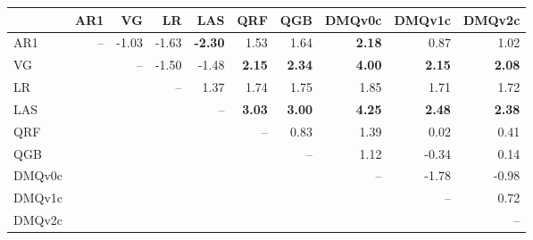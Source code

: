 \begin{tabular}{lrrrrrrrrr}
\toprule
 & AR1 & VG & LR & LAS & QRF & QGB & DMQv0c & DMQv1c & DMQv2c \\
\midrule
AR1 & -- & -1.03 & -1.63 & \textbf{-2.30} & 1.53 & 1.64 & \textbf{2.18} & 0.87 & 1.02 \\
VG &  & -- & -1.50 & -1.48 & \textbf{2.15} & \textbf{2.34} & \textbf{4.00} & \textbf{2.15} & \textbf{2.08} \\
LR &  &  & -- & 1.37 & 1.74 & 1.75 & 1.85 & 1.71 & 1.72 \\
LAS &  &  &  & -- & \textbf{3.03} & \textbf{3.00} & \textbf{4.25} & \textbf{2.48} & \textbf{2.38} \\
QRF &  &  &  &  & -- & 0.83 & 1.39 & 0.02 & 0.41 \\
QGB &  &  &  &  &  & -- & 1.12 & -0.34 & 0.14 \\
DMQv0c &  &  &  &  &  &  & -- & -1.78 & -0.98 \\
DMQv1c &  &  &  &  &  &  &  & -- & 0.72 \\
DMQv2c &  &  &  &  &  &  &  &  & -- \\
\bottomrule
\end{tabular}
